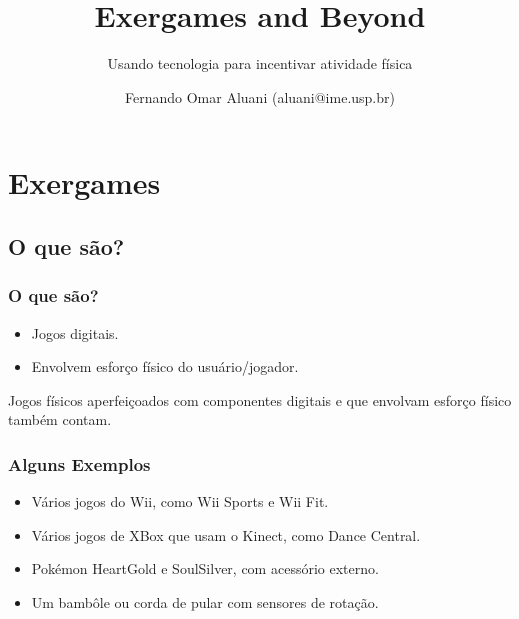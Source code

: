 \documentclass[brazil]{beamer}
\title{
  Exergames and Beyond
}
\subtitle{
  Usando tecnologia para incentivar atividade física
}
\author{Fernando Omar Aluani (aluani@ime.usp.br)}
\begin{document}
\frame{
  \titlepage
}

\frame{\tableofcontents}
%
%
%
%
%

\section{Exergames}

\subsection{O que são?}
\begin{frame}
  \frametitle{O que são?}
  \vspace{-10pt}
  \begin{itemize}
    \pause
    \item Jogos digitais.
    \vspace{10pt}
    \item Envolvem esforço físico do usuário/jogador.
    \vspace{10pt}
  \end{itemize}

  Jogos físicos aperfeiçoados com componentes digitais e que envolvam esforço físico também contam.
\end{frame}
\begin{frame}
  \frametitle{Alguns Exemplos}
  \vspace{-10pt}
  \begin{itemize}
    \pause
    \item Vários jogos do Wii, como Wii Sports e Wii Fit.
    \vspace{10pt}
    \item Vários jogos de XBox que usam o Kinect, como Dance Central.
    \vspace{10pt}
    \item Pokémon HeartGold e SoulSilver, com acessório externo.
    \vspace{10pt}
    \item Um bambôle ou corda de pular com sensores de rotação.
  \end{itemize}
\end{frame}
\end{document}
